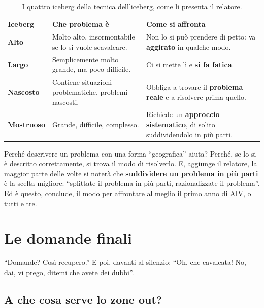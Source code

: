 \begin{table}[htbp]
\centering
\small
\begin{tabular}{@{}lp{4.4cm}p{5.4cm}@{}}
\toprule
\textbf{Iceberg} & \textbf{Che problema è} & \textbf{Come si affronta} \\
\midrule
\textbf{Alto} & Molto alto, insormontabile se lo si vuole scavalcare. &
Non lo si può prendere di petto: va \textbf{aggirato} in qualche modo. \\
\textbf{Largo} & Semplicemente molto grande, ma poco difficile. & Ci si
mette lì e \textbf{si fa fatica}. \\
\textbf{Nascosto} & Contiene situazioni problematiche, problemi nascosti. &
Obbliga a trovare il \textbf{problema reale} e a risolvere prima quello. \\
\textbf{Mostruoso} & Grande, difficile, complesso. & Richiede un
\textbf{approccio sistematico}, di solito suddividendolo in più parti. \\
\bottomrule
\end{tabular}
\caption{I quattro iceberg della tecnica dell'iceberg, come li presenta il
relatore.}
\label{p0:tab:iceberg}
\end{table}

Perché descrivere un problema con una forma ``geografica'' aiuta? Perché, se
lo si è descritto correttamente, si trova il modo di risolverlo. E, aggiunge
il relatore, la maggior parte delle volte si noterà che
\textbf{suddividere un problema in più parti} è la scelta migliore:
``splittate il problema in più parti, razionalizzate il problema''. Ed è
questo, conclude, il modo per affrontare al meglio il primo anno di AIV, o
tutti e tre.

\section{Le domande finali}
\label{p0:sec:domande}

``Domande? Così recupero.'' E poi, davanti al silenzio: ``Oh, che
cavalcata! No, dai, vi prego, ditemi che avete dei dubbi''.

\subsection{A che cosa serve lo zone out?}


